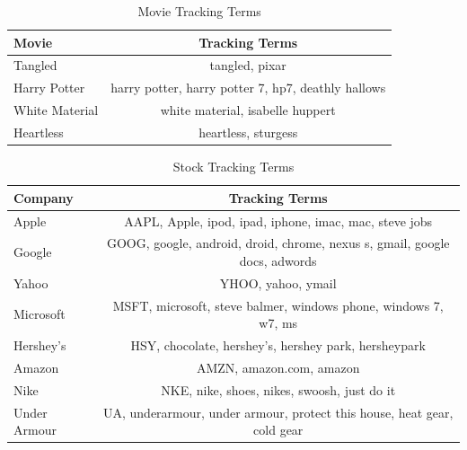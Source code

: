 \documentclass[11pt]{article}
\begin{document}
\begin{table}[ht!]
\centering
\caption{Movie Tracking Terms}
\begin{tabular}{|l|c|}
\hline
 Movie & Tracking Terms \\
\hline
Tangled& tangled, pixar \\
\hline
Harry Potter &harry potter, harry potter 7, hp7, deathly hallows\\
\hline
White Material & white material, isabelle huppert\\
\hline
Heartless &heartless, sturgess\\
\hline
\end{tabular}
\label{trackmov}
\end{table}

\begin{table}[ht!]
\centering
\caption{Stock Tracking Terms}
\begin{tabular}{|l|c|}
\hline
 Company & Tracking Terms \\
\hline
Apple& AAPL, Apple, ipod, ipad, iphone, imac, mac, steve jobs \\
\hline
Google &GOOG, google, android, droid, chrome, nexus s, gmail, google docs, adwords\\
\hline
Yahoo &YHOO, yahoo, ymail\\
\hline
Microsoft & MSFT, microsoft, steve balmer, windows phone, windows 7, w7, ms\\
\hline
Hershey's&HSY, chocolate, hershey's, hershey park, hersheypark \\
\hline
Amazon &AMZN, amazon.com, amazon\\
\hline
Nike & NKE, nike, shoes, nikes, swoosh, just do it\\
\hline
Under Armour &UA, underarmour, under armour, protect this house, heat gear, cold gear\\
\hline
\end{tabular}
\label{trackst}
\end{table}

\newpage
\pagebreak[4]


\end{document}
